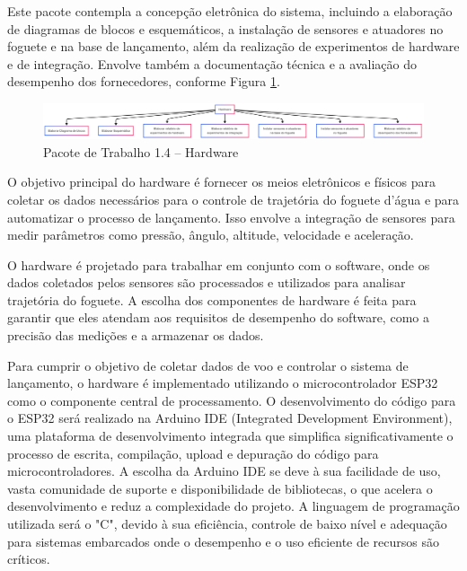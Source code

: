 Este pacote contempla a concepção eletrônica do sistema, incluindo a elaboração de diagramas de blocos e esquemáticos, a instalação de sensores e atuadores no foguete e na base de lançamento, além da realização de experimentos de hardware e de integração. Envolve também a documentação técnica e a avaliação do desempenho dos fornecedores, conforme Figura \ref{fig_eap_hardware}.


\begin{figure}[!h]
	\centering
\includegraphics[width=15cm]{figuras/eap_hardware.png}
	\caption{Pacote de Trabalho 1.4 – Hardware}
	\label{fig_eap_hardware} 
\end{figure}

O objetivo principal do hardware é fornecer os meios eletrônicos e físicos para coletar os dados necessários para o controle de trajetória do foguete d'água e para automatizar o processo de lançamento. Isso envolve a integração de sensores para medir parâmetros como pressão, ângulo, altitude, velocidade e aceleração.

O hardware é projetado para trabalhar em conjunto com o software, onde os dados coletados pelos sensores são processados e utilizados para analisar trajetória do foguete. A escolha dos componentes de hardware é feita para garantir que eles atendam aos requisitos de desempenho do software, como a precisão das medições e a armazenar os dados.


Para cumprir o objetivo de coletar dados de voo e controlar o sistema de lançamento, o hardware é implementado utilizando o microcontrolador ESP32 como o componente central de processamento. O desenvolvimento do código para o ESP32 será realizado na Arduino IDE (Integrated Development Environment), uma plataforma de desenvolvimento integrada que simplifica significativamente o processo de escrita, compilação, upload e depuração do código para microcontroladores. A escolha da Arduino IDE se deve à sua facilidade de uso, vasta comunidade de suporte e disponibilidade de bibliotecas, o que acelera o desenvolvimento e reduz a complexidade do projeto. A linguagem de programação utilizada será o "C", devido à sua eficiência, controle de baixo nível e adequação para sistemas embarcados onde o desempenho e o uso eficiente de recursos são críticos.

